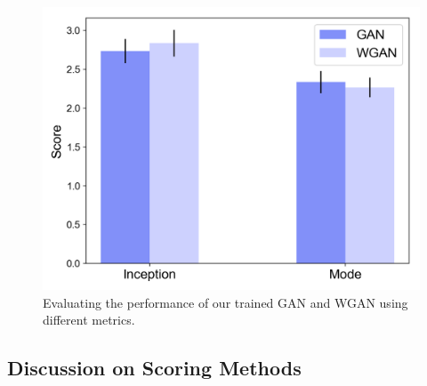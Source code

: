 \documentclass[table]{article}
\begin{document}
\begin{figure}[ht]
  \centering
  \includegraphics[scale=0.45]{imgs/score}
  \caption{Evaluating the performance of our trained GAN and WGAN using different metrics.}
\end{figure}

\subsection{Discussion on Scoring Methods}

\newpage



\newpage
\appendix
\end{document}
